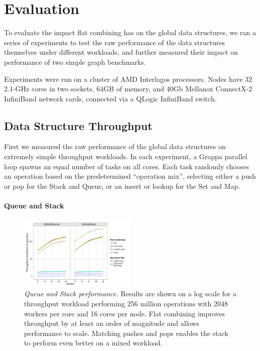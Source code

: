 \section{Evaluation}
To evaluate the impact flat combining has on the global data structures, we ran a series of experiments to test the raw performance of the data structures themselves under different workloads, and further measured their impact on performance of two simple graph benchmarks.

Experiments were run on a cluster of AMD Interlagos processors. Nodes have 32 2.1-GHz cores in two sockets, 64GB of memory, and 40Gb Mellanox ConnectX-2 InfiniBand network cards, connected via a QLogic InfiniBand switch.

\subsection{Data Structure Throughput}
First we measured the raw performance of the global data structures on extremely simple throughput workloads. In each experiment, a Grappa parallel loop spawns an equal number of tasks on all cores. Each task randomly chooses an operation based on the predetermined ``operation mix'', selecting either a push or pop for the Stack and Queue, or an insert or lookup for the Set and Map.

\paragraph{Queue and Stack}
\begin{figure}[t]
  \centering
  \includegraphics[width=0.5\textwidth]{data/plots/vector_perf.pdf}
  \caption{\emph{Queue and Stack performance.}
    Results are shown on a log scale for a throughput workload performing 256 million operations with 2048 workers per core and 16 cores per node. Flat combining improves throughput by at least an order of magnitude and allows performance to scale. Matching pushes and pops enables the stack to perform even better on a mixed workload.
  }
  \label{fig:vector}
\end{figure}

